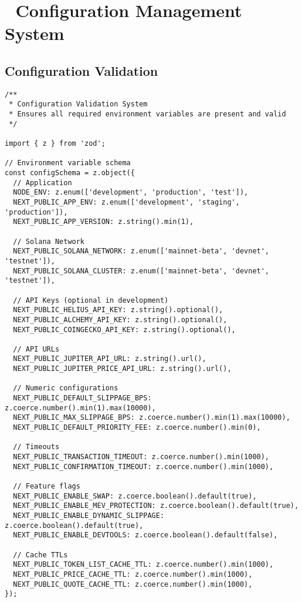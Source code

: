 \documentclass[11pt,a4paper]{article}
\begin{document}
\section{🔧 Configuration Management System}

\subsection{Configuration Validation}

\begin{lstlisting}[style=env, caption=src/utils/config-validation.ts]
/**
 * Configuration Validation System
 * Ensures all required environment variables are present and valid
 */

import { z } from 'zod';

// Environment variable schema
const configSchema = z.object({
  // Application
  NODE_ENV: z.enum(['development', 'production', 'test']),
  NEXT_PUBLIC_APP_ENV: z.enum(['development', 'staging', 'production']),
  NEXT_PUBLIC_APP_VERSION: z.string().min(1),
  
  // Solana Network
  NEXT_PUBLIC_SOLANA_NETWORK: z.enum(['mainnet-beta', 'devnet', 'testnet']),
  NEXT_PUBLIC_SOLANA_CLUSTER: z.enum(['mainnet-beta', 'devnet', 'testnet']),
  
  // API Keys (optional in development)
  NEXT_PUBLIC_HELIUS_API_KEY: z.string().optional(),
  NEXT_PUBLIC_ALCHEMY_API_KEY: z.string().optional(),
  NEXT_PUBLIC_COINGECKO_API_KEY: z.string().optional(),
  
  // API URLs
  NEXT_PUBLIC_JUPITER_API_URL: z.string().url(),
  NEXT_PUBLIC_JUPITER_PRICE_API_URL: z.string().url(),
  
  // Numeric configurations
  NEXT_PUBLIC_DEFAULT_SLIPPAGE_BPS: z.coerce.number().min(1).max(10000),
  NEXT_PUBLIC_MAX_SLIPPAGE_BPS: z.coerce.number().min(1).max(10000),
  NEXT_PUBLIC_DEFAULT_PRIORITY_FEE: z.coerce.number().min(0),
  
  // Timeouts
  NEXT_PUBLIC_TRANSACTION_TIMEOUT: z.coerce.number().min(1000),
  NEXT_PUBLIC_CONFIRMATION_TIMEOUT: z.coerce.number().min(1000),
  
  // Feature flags
  NEXT_PUBLIC_ENABLE_SWAP: z.coerce.boolean().default(true),
  NEXT_PUBLIC_ENABLE_MEV_PROTECTION: z.coerce.boolean().default(true),
  NEXT_PUBLIC_ENABLE_DYNAMIC_SLIPPAGE: z.coerce.boolean().default(true),
  NEXT_PUBLIC_ENABLE_DEVTOOLS: z.coerce.boolean().default(false),
  
  // Cache TTLs
  NEXT_PUBLIC_TOKEN_LIST_CACHE_TTL: z.coerce.number().min(1000),
  NEXT_PUBLIC_PRICE_CACHE_TTL: z.coerce.number().min(1000),
  NEXT_PUBLIC_QUOTE_CACHE_TTL: z.coerce.number().min(1000),
});


\end{lstlisting}
\end{document}
